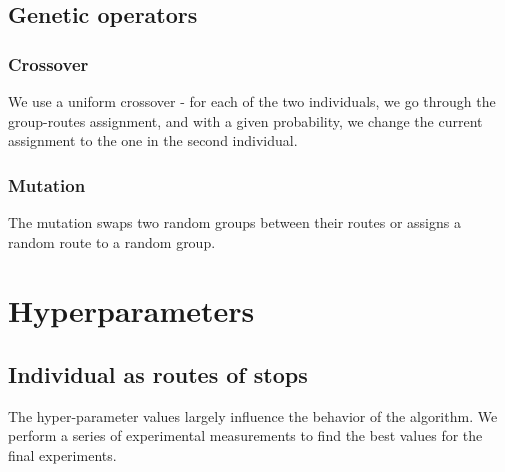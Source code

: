 \subsection{Genetic operators}

\subsubsection{Crossover}

We use a uniform crossover - for each of the two individuals, we go through the group-routes assignment, and with a given probability, we change the current assignment to the one in the second individual.

\subsubsection{Mutation}

The mutation swaps two random groups between their routes or assigns a random route to a random group.

\section{Hyperparameters}

\subsection{Individual as routes of stops}

The hyper-parameter values largely influence the behavior of the algorithm. We perform a series of experimental measurements to find the best values for the final experiments.

